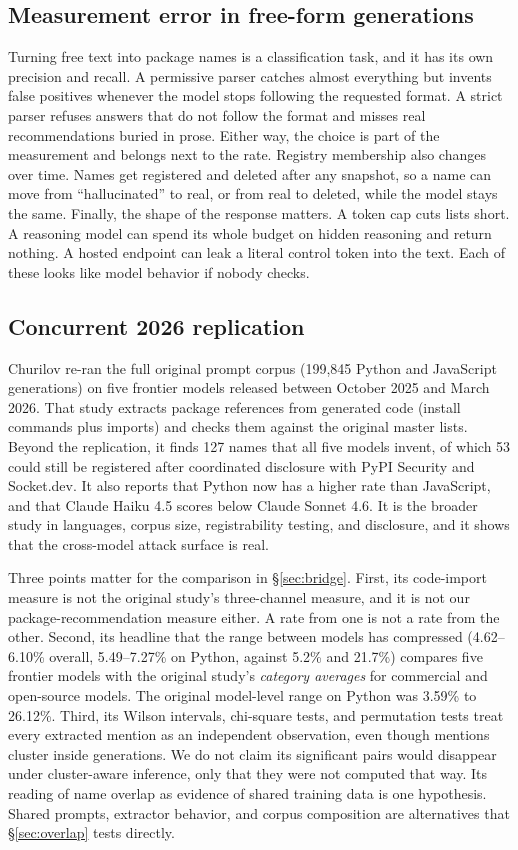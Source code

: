 \documentclass[10pt,twocolumn,letterpaper]{article}
\begin{document}
\subsection{Measurement error in free-form generations}

Turning free text into package names is a classification task, and it has its own precision and
recall. A permissive parser catches almost everything but invents false positives whenever the model
stops following the requested format. A strict parser refuses answers that do not follow the format
and misses real recommendations buried in prose. Either way, the choice is part of the measurement
and belongs next to the rate. Registry membership also changes over time. Names get registered and
deleted after any snapshot, so a name can move from ``hallucinated'' to real, or from real to
deleted, while the model stays the same. Finally, the shape of the response matters. A token cap cuts
lists short. A reasoning model can spend its whole budget on hidden reasoning and return nothing. A
hosted endpoint can leak a literal control token into the text. Each of these looks like model
behavior if nobody checks.

\subsection{Concurrent 2026 replication}

Churilov \citep{churilov2026range} re-ran the full original prompt corpus (199,845 Python and
JavaScript generations) on five frontier models released between October 2025 and March 2026. That
study extracts package references from generated code (install commands plus imports) and checks
them against the original master lists. Beyond the replication, it finds 127 names that all five
models invent, of which 53 could still be registered after coordinated disclosure with PyPI Security
and Socket.dev. It also reports that Python now has a higher rate than JavaScript, and that Claude
Haiku 4.5 scores below Claude Sonnet 4.6. It is the broader study in languages, corpus size,
registrability testing, and disclosure, and it shows that the cross-model attack surface is real.

Three points matter for the comparison in \S\ref{sec:bridge}. First, its code-import measure is not
the original study's three-channel measure, and it is not our package-recommendation measure either.
A rate from one is not a rate from the other. Second, its headline that the range between models has
compressed (4.62--6.10\% overall, 5.49--7.27\% on Python, against 5.2\% and 21.7\%) compares five
frontier models with the original study's \emph{category averages} for commercial and open-source
models. The original model-level range on Python was 3.59\% to 26.12\%. Third, its Wilson intervals,
chi-square tests, and permutation tests treat every extracted mention as an independent observation,
even though mentions cluster inside generations. We do not claim its significant pairs would
disappear under cluster-aware inference, only that they were not computed that way. Its reading of
name overlap as evidence of shared training data is one hypothesis. Shared prompts, extractor
behavior, and corpus composition are alternatives that \S\ref{sec:overlap} tests directly.
\end{document}
